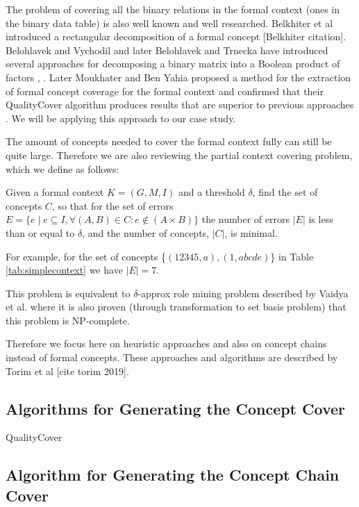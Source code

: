 \documentclass[acmconf,authordraft]{acmart}
\begin{document}
The problem of covering all the binary relations in the formal context (ones in the binary data table) is also well known and well researched.  Belkhiter et al introduced a rectangular decomposition of a formal concept [Belkhiter citation]. Belohlavek and Vychodil and later Belohlavek and Trnecka have introduced several approaches for decomposing a binary matrix into a Boolean product of factors \cite{belohlavek_discovery_2010}, \cite{belohlavek_-below_2015}. Later Moukhater and Ben Yahia proposed a method for the extraction of formal concept coverage for the formal context and confirmed that their QualityCover algorithm produces results that are superior to previous approaches \cite{mouakher_qualitycover:_2016}. We will be applying this approach to our case study.

The amount of concepts needed to cover the formal context fully can still be quite large. Therefore we are also reviewing the partial context covering problem, which we define as follows:

\begin{definition}
\label{def_errors}

Given a formal context $ K = (G, M, I)$ and a threshold $\delta$, find the set of concepts $C$, so that for the set of errors $E = \{e \mid e \subseteq I, \forall (A, B) \in C: e \notin (A \times B)  \}$ the number of errors $|E|$ is less than or equal to $\delta$, and the number of concepts, $|C|$, is minimal.

\end{definition}

For example, for the set of concepts \{${(12345, a), (1, abcde)}$\} in Table \ref{tab:simplecontext}  we have $|E|=7$.

This problem is equivalent to $\delta$-approx role mining problem described by Vaidya et al. \cite{vaidya_role_2007} where it is also proven (through transformation to set basis problem) that this problem is NP-complete. 

Therefore we focus here on heuristic approaches and also on concept chains instead of formal concepts. These approaches and algorithms are described by Torim et al [cite torim 2019].

\subsection{Algorithms for Generating the Concept Cover}
QualityCover

\subsection{Algorithm for Generating the Concept Chain Cover}
\end{document}
